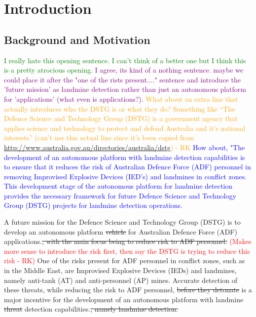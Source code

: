 \documentclass[main.tex]{subfiles}
\begin{document}

\chapter{Introduction}

\section{Background and Motivation}
\textcolor{green}{I really hate this opening sentence. I can't think of a better one but I think this is a pretty atrocious opening.}
\textcolor{purple}{I agree, its kind of a nothing sentence. maybe we could place it after the "one of the rists present...." sentence and introduce the 'future mission' as landmine detection rather than just an autonomous platform for 'applications' (what even is applications?).}
\textcolor{orange}{What about an extra line that actually introduces who the DSTG is or what they do? Something like ``The Defence Science and Technology Group (DSTG) is a government agency that applies science and technology to protect and defend Australia and it's national interests'' (can't use this actual line since it's been copied from \url{http://www.australia.gov.au/directories/australia/dstg}) - RK} 
\textcolor{blue}{How about, "The development of an autonomous platform with landmine detection capabilities is to ensure that it reduces the risk of Australian Defence Force (ADF) personnel in removing Improvised Explosive Devices (IED's) and landmines in conflict zones.  This development stage of the autonomous platform for landmine detection provides the necessary framework for future Defence Science and Technology Group (DSTG) projects for landmine detection operations.}

A future mission for the Defence Science and Technology Group (DSTG) is to develop an autonomous platform \sout{vehicle} for Australian Defence Force (ADF) applications.\sout{, with the main focus being to reduce risk to ADF personnel.} 
\textcolor{red}{(Makes more sense to introduce the risk first, then say the DSTG is trying to reduce this risk - RK)} 
One of the risks present for ADF personnel in conflict zones, such as in the Middle East, are Improvised Explosive Devices (IEDs) and landmines, namely anti-tank (AT) and anti-personnel (AP) mines. Accurate detection of these threats, while reducing the risk to ADF personnel, \sout{before they detonate} is a major incentive for the development of an autonomous platform with landmine \sout{threat} detection capabilities.\sout{, namely landmine detection.}
\\
% 
% 
%
%
%
\end{document}
